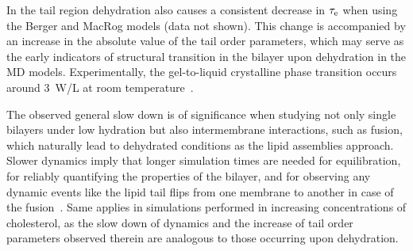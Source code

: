 \documentclass[journal=jpcbfk,manuscript=article,layout=twocolumn]{achemso}
\begin{document}
In the tail region dehydration also causes a consistent decrease in $\tau_{\rm{e}}$ when using the Berger and MacRog models (data not shown). This change is accompanied by an increase in the absolute value of the tail order parameters, which may serve as the early indicators of structural transition in the bilayer upon dehydration in the MD models.  Experimentally, the gel-to-liquid crystalline phase transition occurs around 3~W/L at room temperature~\cite{lynch89}.

The observed general slow down is of significance when studying not only single bilayers under low hydration but also intermembrane interactions, such as fusion, which naturally lead to dehydrated conditions as the lipid assemblies approach. Slower dynamics imply that longer simulation times are needed for equilibration, for reliably quantifying the properties of the bilayer, and for observing any dynamic events like the lipid tail flips from one membrane to another in case of the fusion~\cite{best citation here}. Same applies in simulations performed in increasing concentrations of cholesterol, as the slow down of dynamics and the increase of tail order parameters observed therein are analogous to those occurring upon dehydration. 
\end{document}
